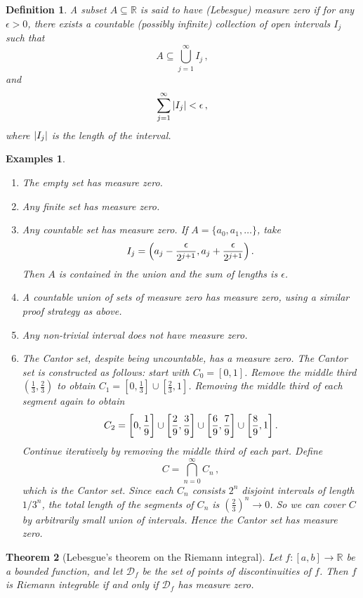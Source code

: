 \documentclass{article}
\theoremstyle{plain}\theoremheaderfont{\normalfont\itshape}\theorembodyfont{\rmfamily}\theoremseparator{.}\newtheorem*{rem}{Remark}\newtheorem*{ex}{Example}\newtheorem*{proof}{Proof}\newtheorem*{altp}{Alternative proof}
\theoremstyle{plain}\theoremheaderfont{\normalfont\bfseries}\theorembodyfont{\rmfamily}\theoremseparator{.}\newtheorem{thm}{Theorem}[section]\newtheorem{lem}[thm]{Lemma}\newtheorem{prop}[thm]{Proposition}\newtheorem*{cor}{Corollary}\newtheorem{defn}[thm]{Definition}\newtheorem{clm}[thm]{Claim}\newtheorem{clminproof}{Claim}
\theoremstyle{break}\theoremheaderfont{\normalfont\itshape}\theorembodyfont{\rmfamily}\theoremseparator{.\medskip}\newtheorem*{proofskip}{Proof}\newtheorem*{exs}{Examples}\newtheorem*{rems}{Remarks}
\theoremstyle{break}\theoremheaderfont{\normalfont\bfseries}\theorembodyfont{\rmfamily}\theoremseparator{.\medskip}\newtheorem{lemskip}[thm]{Lemma}\newtheorem{defnskip}[thm]{Definition}\newtheorem{propskip}[thm]{Proposition}\newtheorem{thmskip}[thm]{Theorem}
\begin{document}
    \begin{defn}
        A subset \(A\subseteq\mathbb{R}\) is said to have \textit{(Lebesgue) measure zero} if for any \(\epsilon>0\), there exists a countable (possibly infinite) collection of open intervals \(I_j\) such that
        \[A\subseteq\bigcup_{j=1}^{\infty}I_j\,,\]
        and
        \[\sum_{j=1}^{\infty}\abs{I_j}<\epsilon\,,\]
        where \(\abs{I_j}\) is the length of the interval.
    \end{defn}
    \begin{exs}
        \begin{enumerate}[label=(\roman*),topsep=0pt]
            \item The empty set has measure zero.
            \item Any finite set has measure zero.
            \item Any countable set has measure zero. If \(A=\{a_0,a_1,\dots\}\), take
            \[I_j=\qty(a_j-\frac{\epsilon}{2^{j+1}},a_j+\frac{\epsilon}{2^{j+1}})\,.\]
            Then \(A\) is contained in the union and the sum of lengths is \(\epsilon\).
            \item A countable union of sets of measure zero has measure zero, using a similar proof strategy as above.
            \item Any non-trivial interval does not have measure zero.
            \item The \textit{Cantor set}, despite being uncountable, has a measure zero. The Cantor set is constructed as follows: start with \(C_0=[0,1]\). Remove the middle third \((\frac{1}{3},\frac{2}{3})\) to obtain \(C_1=[0,\frac{1}{3}]\cup [\frac{2}{3},1]\). Removing the middle third of each segment again to obtain
            \[C_2=\qty[0,\frac{1}{9}]\cup\qty[\frac{2}{9},\frac{3}{9}]\cup\qty[\frac{6}{9},\frac{7}{9}]\cup\qty[\frac{8}{9},1]\,.\]
            Continue iteratively by removing the middle third of each part. Define
            \[C=\bigcap_{n=0}^{\infty}C_n\,,\]
            which is the Cantor set. Since each \(C_n\) consists \(2^n\) disjoint intervals of length \(1/3^n\), the total length of the segments of \(C_n\) is \((\frac{2}{3})^n\to 0\). So we can cover \(C\) by arbitrarily small union of intervals. Hence the Cantor set has measure zero.
        \end{enumerate}    
    \end{exs}
    
    \begin{thm}[Lebesgue's theorem on the Riemann integral]
        Let \(f:[a,b] \to\mathbb{R}\) be a bounded function, and let \(\mathcal{D}_f\) be the set of points of discontinuities of \(f\). Then \(f\) is Riemann integrable if and only if \(\mathcal{D}_f\) has measure zero.
    \end{thm}
    \newpage
\end{document}
